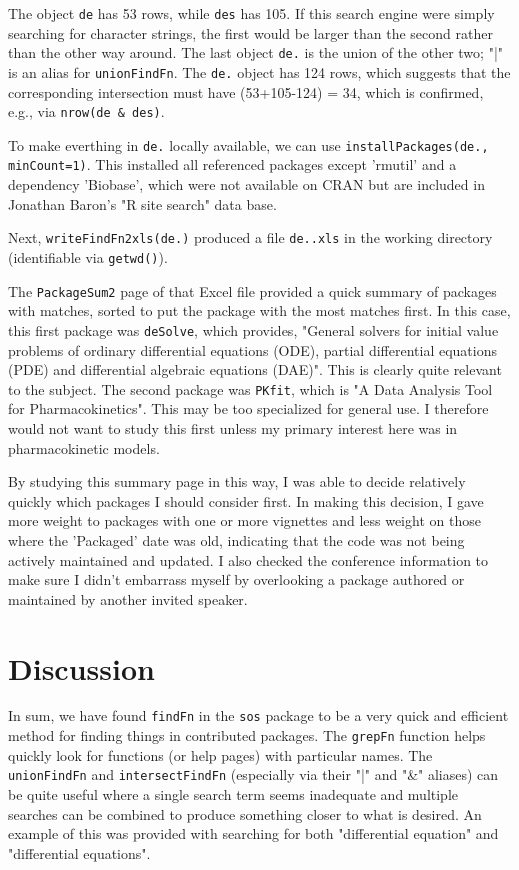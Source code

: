 The object {\tt de} has 53 rows, while {\tt des} has 105.  
If this search engine were simply searching for character 
strings, the first would be larger than the second rather than 
the other way around.  The last object {\tt de.} is the union
of the other two;  "|" is an alias for {\tt unionFindFn}.  
The {\tt de.} object has 124 rows, which suggests that 
the corresponding intersection must have (53+105-124) = 34, which 
is confirmed, e.g., via {\tt nrow(de \& des)}.  

To make everthing in {\tt de.} locally available, we can use 
{\tt installPackages(de., minCount=1)}.  This installed all 
referenced packages except 'rmutil' and a dependency 'Biobase', 
which were not available on CRAN but are included in Jonathan 
Baron's "R site search" data base.  

Next, {\tt writeFindFn2xls(de.)} produced a file {\tt de..xls} 
in the working directory (identifiable via {\tt getwd()}).  

The {\tt PackageSum2} page of that Excel file provided a quick 
summary of packages with matches, sorted to put the package 
with the most matches first.  In this case, this first package 
was {\tt deSolve}, which provides, "General solvers for initial 
value problems of ordinary differential equations (ODE), 
partial differential equations (PDE) and differential 
algebraic equations (DAE)".  This is clearly quite relevant 
to the subject.  The second package was {\tt PKfit}, which 
is "A Data Analysis Tool for Pharmacokinetics".  This may 
be too specialized for general use.  I therefore would not 
want to study this first unless my primary interest here was in 
pharmacokinetic models.  

By studying this summary page in this way, I was able to decide 
relatively quickly which packages I should consider first.  In 
making this decision, I gave more weight to packages with 
one or more vignettes and less weight on those where the 
'Packaged' date was old, indicating that the code was not being 
actively maintained and updated.  I also checked the conference 
information to make sure I didn't embarrass myself by overlooking 
a package authored or maintained by another invited speaker.  

\section*{Discussion}
In sum, we have found {\tt findFn} in the {\tt sos} package to
be a very quick and efficient method for finding things in
contributed packages.  The {\tt grepFn} function helps quickly 
look for functions (or help pages) with particular names.  
The {\tt unionFindFn} and {\tt intersectFindFn} (especially via 
their "|" and "\&" aliases) can be quite useful where a single 
search term seems inadequate and multiple searches can be 
combined to produce something closer to what is desired.  
An example of this was provided with searching for both
"differential equation" and "differential equations".  

